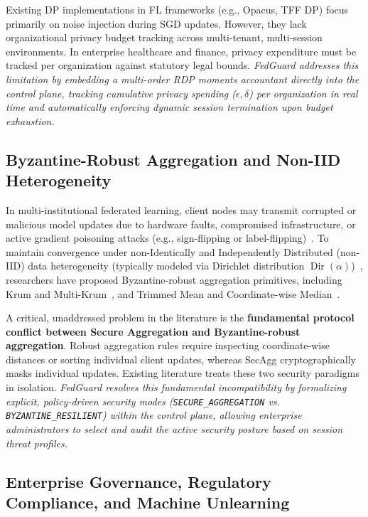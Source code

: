 Existing DP implementations in FL frameworks (e.g., Opacus, TFF DP) focus primarily on noise injection during SGD updates. However, they lack organizational privacy budget tracking across multi-tenant, multi-session environments. In enterprise healthcare and finance, privacy expenditure must be tracked per organization against statutory legal bounds. \textit{FedGuard addresses this limitation by embedding a multi-order RDP moments accountant directly into the control plane, tracking cumulative privacy spending ($\epsilon, \delta$) per organization in real time and automatically enforcing dynamic session termination upon budget exhaustion.}

\subsection{Byzantine-Robust Aggregation and Non-IID Heterogeneity}

In multi-institutional federated learning, client nodes may transmit corrupted or malicious model updates due to hardware faults, compromised infrastructure, or active gradient poisoning attacks (e.g., sign-flipping or label-flipping)~\cite{fang2020local}. To maintain convergence under non-Identically and Independently Distributed (non-IID) data heterogeneity (typically modeled via Dirichlet distribution $\operatorname{Dir}(\alpha)$)~\cite{hsu2019measuring, li2020federated}, researchers have proposed Byzantine-robust aggregation primitives, including Krum and Multi-Krum~\cite{blanchard2017machine}, and Trimmed Mean and Coordinate-wise Median~\cite{yin2018byzantine}.

A critical, unaddressed problem in the literature is the \textbf{fundamental protocol conflict between Secure Aggregation and Byzantine-robust aggregation}. Robust aggregation rules require inspecting coordinate-wise distances or sorting individual client updates, whereas SecAgg cryptographically masks individual updates. Existing literature treats these two security paradigms in isolation. \textit{FedGuard resolves this fundamental incompatibility by formalizing explicit, policy-driven security modes (\texttt{SECURE\_AGGREGATION} vs. \texttt{BYZANTINE\_RESILIENT}) within the control plane, allowing enterprise administrators to select and audit the active security posture based on session threat profiles.}

\subsection{Enterprise Governance, Regulatory Compliance, and Machine Unlearning}

